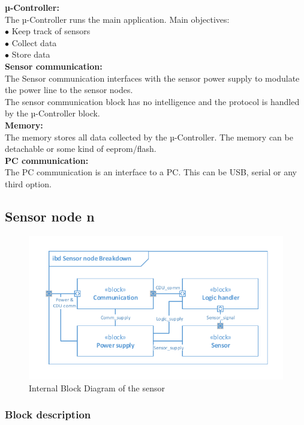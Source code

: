 \textbf{µ-Controller:}\\
The µ-Controller runs the main application. Main objectives:\\
$\bullet$ Keep track of sensors\\
$\bullet$ Collect data\\
$\bullet$ Store data\\

\textbf{Sensor communication:}\\
The Sensor communication interfaces with the sensor power supply to modulate the power line to the sensor nodes.\\
The sensor communication block has no intelligence and the protocol is handled by the µ-Controller block.\\

\textbf{Memory:}\\
The memory stores all data collected by the µ-Controller. The memory can be detachable or some kind of eeprom/flash.\\

\textbf{PC communication:}\\
The PC communication is an interface to a PC. This can be USB, serial or any third option.\\


\subsection{Sensor node n}

\begin{figure}[hbpt]
\centering
\includegraphics[width=.8\textwidth]{billeder/Sensor_IBD}
\caption{Internal Block Diagram of the sensor}
\label{Sensor_IBD}
\end{figure}

\subsubsection{Block description}


